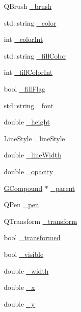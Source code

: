 \begin{DoxyCompactItemize}
\item 
Q\+Brush \mbox{\hyperlink{classsgl_1_1GObject_aab24462ec896b596d99911767b0912d0}{\+\_\+brush}}
\item 
std\+::string \mbox{\hyperlink{classsgl_1_1GObject_a1134e770ae4315ea8bc1201e2f21da8b}{\+\_\+color}}
\item 
int \mbox{\hyperlink{classsgl_1_1GObject_a003fdd343d9b7505c53a8b7a134200ed}{\+\_\+color\+Int}}
\item 
std\+::string \mbox{\hyperlink{classsgl_1_1GObject_a179f8d6cee65cd8a54692e32b224392a}{\+\_\+fill\+Color}}
\item 
int \mbox{\hyperlink{classsgl_1_1GObject_a751def333a67d651e5b99cc331ecb496}{\+\_\+fill\+Color\+Int}}
\item 
bool \mbox{\hyperlink{classsgl_1_1GObject_ad4a55cbcd61b58a4d49666490bb2f103}{\+\_\+fill\+Flag}}
\item 
std\+::string \mbox{\hyperlink{classsgl_1_1GObject_aea76ea1a8b5dd7b0a78653277e63b536}{\+\_\+font}}
\item 
double \mbox{\hyperlink{classsgl_1_1GObject_ad05df29e7f27fc504abd743e3d8b4e73}{\+\_\+height}}
\item 
\mbox{\hyperlink{classsgl_1_1GObject_a86e0f5648542856159bb40775c854aa7}{Line\+Style}} \mbox{\hyperlink{classsgl_1_1GObject_a89bafecaafb7c72d55c7efc10b7d0523}{\+\_\+line\+Style}}
\item 
double \mbox{\hyperlink{classsgl_1_1GObject_a16e9033665937f13de2e163dc2184aff}{\+\_\+line\+Width}}
\item 
double \mbox{\hyperlink{classsgl_1_1GObject_a20eff8eb7af27182edc9bfc54768b6f3}{\+\_\+opacity}}
\item 
\mbox{\hyperlink{classsgl_1_1GCompound}{G\+Compound}} $\ast$ \mbox{\hyperlink{classsgl_1_1GObject_ac9452c1eaff70eebddbb318196aa3835}{\+\_\+parent}}
\item 
Q\+Pen \mbox{\hyperlink{classsgl_1_1GObject_afb69d172743f868299847174eb1b6bc8}{\+\_\+pen}}
\item 
Q\+Transform \mbox{\hyperlink{classsgl_1_1GObject_a475b8860a5f1adb4a1fdc58d1f5c1e32}{\+\_\+transform}}
\item 
bool \mbox{\hyperlink{classsgl_1_1GObject_ae4725802fc8d8aaa0ab4bd4781f7e07c}{\+\_\+transformed}}
\item 
bool \mbox{\hyperlink{classsgl_1_1GObject_a9312c72508471b7c7a87b540263e1af4}{\+\_\+visible}}
\item 
double \mbox{\hyperlink{classsgl_1_1GObject_ab55d85a3371770e6725b1062cf160cd8}{\+\_\+width}}
\item 
double \mbox{\hyperlink{classsgl_1_1GObject_a6675b83b27137b8d3aa2ad8133078ea6}{\+\_\+x}}
\item 
double \mbox{\hyperlink{classsgl_1_1GObject_a2f0f6aeafddc8a39c578bfa7e22b5f1e}{\+\_\+y}}
\end{DoxyCompactItemize}


